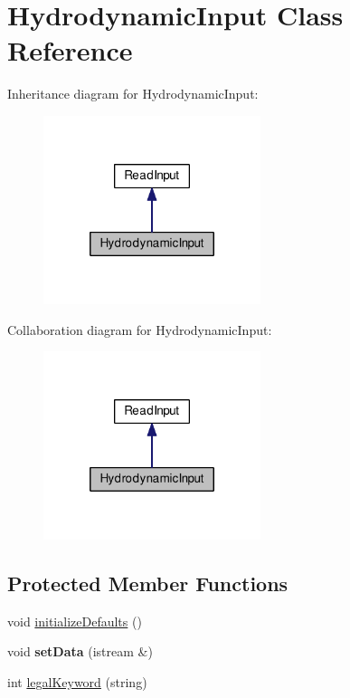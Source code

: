 \hypertarget{class_hydrodynamic_input}{\section{Hydrodynamic\-Input Class Reference}
\label{class_hydrodynamic_input}
}


Inheritance diagram for Hydrodynamic\-Input\-:\nopagebreak
\begin{figure}[H]
\begin{center}
\leavevmode
\includegraphics[width=180pt]{class_hydrodynamic_input__inherit__graph}
\end{center}
\end{figure}


Collaboration diagram for Hydrodynamic\-Input\-:\nopagebreak
\begin{figure}[H]
\begin{center}
\leavevmode
\includegraphics[width=180pt]{class_hydrodynamic_input__coll__graph}
\end{center}
\end{figure}
\subsection*{Protected Member Functions}
\begin{DoxyCompactItemize}
\item 
void \hyperlink{class_hydrodynamic_input_a311ec06f62b7929fb6712e90240a1436}{initialize\-Defaults} ()
\item 
\hypertarget{class_hydrodynamic_input_a5497b513fc1785b84dccea59fd16fff2}{void {\bfseries set\-Data} (istream \&)}\label{class_hydrodynamic_input_a5497b513fc1785b84dccea59fd16fff2}

\item 
int \hyperlink{class_hydrodynamic_input_a6cf4ad1a8407191c8e2633ca0554f641}{legal\-Keyword} (string)
\end{DoxyCompactItemize}
